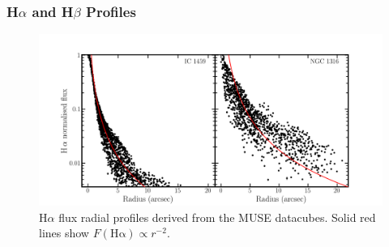 \documentclass[a4paper,fleqn,usenatbib]{mnras}
\begin{document}




		\subsubsection{H$\alpha$ and H$\beta$ Profiles}
			\label{subsubsec:Hb}

			\begin{figure}
				\centering
				\includegraphics[width=0.73\columnwidth]{Halpha_profile.png}
				\caption{H$\alpha$ flux radial profiles derived from the MUSE datacubes. Solid red lines show $F(\mathrm{H\alpha}) \propto r^{-2}$.}
				\label{fig:Ha_profile_MUSE}
			\end{figure}
\end{document}
